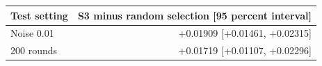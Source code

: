 \begin{tabular}{lr}
\toprule
Test setting & S3 minus random selection [95 percent interval] \\
\midrule
Noise 0.01 & +0.01909 [+0.01461, +0.02315] \\
200 rounds & +0.01719 [+0.01107, +0.02296] \\
\bottomrule
\end{tabular}
